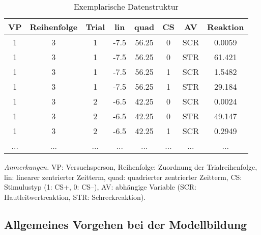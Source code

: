 		\begin{table}[hbt] \small {}
			\begin{threeparttable}
				\caption{Exemplarische Datenstruktur}			%
				\label{tab:structure}
				\begin{tabularx}{\textwidth}{CCCCCCCC}         \toprule	
					VP  & Reihenfolge & Trial & lin  & quad  & CS & AV  & Reaktion \\\hline
					1   & 3     & 1     & -7.5 & 56.25 & 0        & SCR & 0.0059   \\
					1   & 3     & 1     & -7.5 & 56.25 & 0        & STR & 61.421   \\
					1   & 3     & 1     & -7.5 & 56.25 & 1        & SCR & 1.5482   \\
					1   & 3     & 1     & -7.5 & 56.25 & 1        & STR & 29.184   \\
					1   & 3     & 2     & -6.5 & 42.25 & 0        & SCR & 0.0024   \\
					1   & 3     & 2     & -6.5 & 42.25 & 0        & STR & 49.147   \\
					1   & 3     & 2     & -6.5 & 42.25 & 1        & SCR & 0.2949   \\
					... & ...   & ...   & ...  & ...   & ...      & ... & ... \\[-0.2em]\bottomrule 
				\end{tabularx}
				\begin{tablenotes}
					\footnotesize{
						\item \textit{Anmerkungen.} VP: Versuchsperson, Reihenfolge: Zuordnung der Trialreihenfolge, lin: linearer zentrierter Zeitterm, quad: quadrierter zentrierter Zeitterm, CS: Stimulustyp (1: CS+, 0: CS--), AV: abhängige Variable (SCR: Hautleitwertreaktion, STR: Schreckreaktion).}
				\end{tablenotes}
			\end{threeparttable}
		\end{table}
		
		\subsection{Allgemeines Vorgehen bei der Modellbildung}
		
